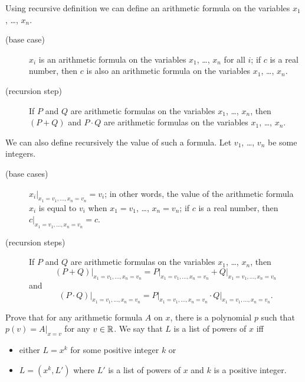 \begin{chapterendexercises}
    \exercise[recommended]
        Using recursive definition we can define an arithmetic formula on the
        variables $x_1$, \dots, $x_n$.
        \begin{description}
            \item [(base case)] $x_i$ is an arithmetic formula on the variables $x_1$,
                \dots, $x_n$ for all $i$; if $c$ is a real number, then $c$ is also
                an arithmetic formula on the variables $x_1$, \dots, $x_n$.
            \item[(recursion step)] If $P$ and $Q$ are arithmetic formulas on the variables
                $x_1$, \dots, $x_n$, then $(P + Q)$ and $P \cdot Q$ are arithmetic formulas
                on the variables $x_1$, \dots, $x_n$.
        \end{description}

        We can also define recursively the value of such a formula.
        Let $v_1$, \dots, $v_n$ be some integers.
        \begin{description}
            \item[(base cases)] $x_i\big\rvert_{x_1 = v_1, \dots, x_n = v_n} = v_i$; in
                other words, the value of the arithmetic formula $x_i$ is equal to $v_i$
                when $x_1 = v_1$, \dots, $x_n = v_n$; if $c$ is a real number, then
                $c\rvert_{x_1 = v_1, \dots, x_n = v_n} = c$.
            \item[(recursion steps)] If $P$ and $Q$ are arithmetic formulas on the
            variables $x_1$, \dots, $x_n$, then
            \[
                (P + Q)\big\rvert_{x_1 = v_1, \dots, x_n = v_n} =
                P\big\rvert_{x_1 = v_1, \dots, x_n = v_n} +
                Q\big\rvert_{x_1 = v_1, \dots, x_n = v_n}
            \]
            and
            \[
                (P \cdot Q)\big\rvert_{x_1 = v_1, \dots, x_n = v_n} =
                P\big\rvert_{x_1 = v_1, \dots, x_n = v_n} \cdot
                Q\big\rvert_{x_1 = v_1, \dots, x_n = v_n}.
            \]
        \end{description}

        Prove that for any arithmetic formula $A$ on $x$, there is a polynomial
        $p$ such that $p(v) = A\big\rvert_{x = v}$ for any $v \in {\mathbb{R}}$.
    \exercise We say that $L$ is a list of powers of $x$ iff
        \begin{itemize}
            \item either $L = x^k$ for some positive integer $k$ or
            \item $L = (x^k, L')$ where $L'$ is a list of powers of $x$ and
                $k$ is a positive integer.
        \end{itemize}


\end{chapterendexercises}
